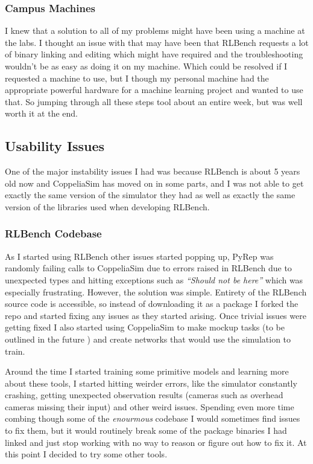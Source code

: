 \subsubsection{Campus Machines}
I knew that a solution to all of my problems might have been using a machine at the labs. I thought an issue with that may have been that RLBench requests a lot of binary linking and editing which might have required and the troubleshooting wouldn't be as easy as doing it on my machine. Which could be resolved if I requested a machine to use, but I though my personal machine had the appropriate powerful hardware for a machine learning project and wanted to use that. So jumping through all these steps tool about an entire week, but was well worth it at the end.


\subsection{Usability Issues}
One of the major instability issues I had was because RLBench is about 5 years old now and CoppeliaSim has moved on in some parts, and I was not able to get exactly the same version of the simulator they had as well as exactly the same version of the libraries used when developing RLBench.

\subsubsection{RLBench Codebase}
As I started using RLBench other issues started popping up, PyRep was randomly failing calls to CoppeliaSim due to errors raised in RLBench due to unexpected types and hitting exceptions such as \emph{``Should not be here''} which was especially frustrating. However, the solution was simple. Entirety of the RLBench source code is accessible, so instead of downloading it as a package I forked the repo and started fixing any issues as they started arising. Once trivial issues were getting fixed I also started using CoppeliaSim to make mockup tasks (to be outlined in the future ) and create networks that would use the simulation to train.


Around the time I started training some primitive models and learning more about these tools, I started hitting weirder errors, like the simulator constantly crashing, getting unexpected observation results (cameras such as overhead cameras  missing their input) and other weird issues. Spending even more time combing though some of the \emph{enourmous} codebase I would sometimes find issues to fix them, but it would routinely break some of the package binaries I had linked and just stop working with no way to reason or figure out how to fix it. At this point I decided to try some other tools.

